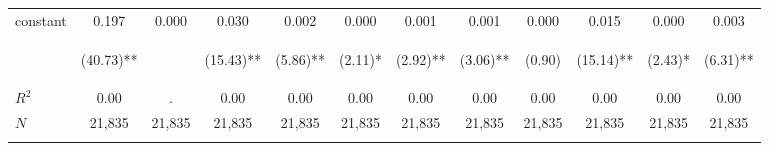 \begin{tabular}{lccccccccccc}
\noalign{\smallskip}constant & 0.197 & 0.000 & 0.030 & 0.002 & 0.000 & 0.001 & 0.001 & 0.000 & 0.015 & 0.000 & 0.003\\
 & \begin{footnotesize}(40.73)**\end{footnotesize} & \begin{footnotesize}\end{footnotesize} & \begin{footnotesize}(15.43)**\end{footnotesize} & \begin{footnotesize}(5.86)**\end{footnotesize} & \begin{footnotesize}(2.11)*\end{footnotesize} & \begin{footnotesize}(2.92)**\end{footnotesize} & \begin{footnotesize}(3.06)**\end{footnotesize} & \begin{footnotesize}(0.90)\end{footnotesize} & \begin{footnotesize}(15.14)**\end{footnotesize} & \begin{footnotesize}(2.43)*\end{footnotesize} & \begin{footnotesize}(6.31)**\end{footnotesize}\\
\noalign{\smallskip}$R^2$ & 0.00 & . & 0.00 & 0.00 & 0.00 & 0.00 & 0.00 & 0.00 & 0.00 & 0.00 & 0.00\\
$N$ & 21,835 & 21,835 & 21,835 & 21,835 & 21,835 & 21,835 & 21,835 & 21,835 & 21,835 & 21,835 & 21,835\\
\noalign{\smallskip}\hline\hline\end{tabular}
